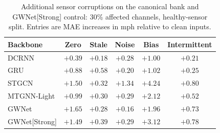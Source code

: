 \begin{table}[h]
\centering\small
\caption{Additional sensor corruptions on the canonical bank and GWNet[Strong] control: 30\% affected channels, healthy-sensor split. Entries are MAE increases in mph relative to clean inputs.}
\label{tab:corruption_summary}
\begin{tabular}{lccccc}
\toprule
\textbf{Backbone} & \textbf{Zero} & \textbf{Stale} & \textbf{Noise} & \textbf{Bias} & \textbf{Intermittent} \\
\midrule
DCRNN & $+0.39$ & $+0.18$ & $+0.28$ & $+1.00$ & $+0.21$ \\
GRU & $+0.88$ & $+0.58$ & $+0.20$ & $+1.02$ & $+0.25$ \\
STGCN & $+1.50$ & $+0.32$ & $+1.34$ & $+4.24$ & $+0.80$ \\
MTGNN-Light & $+0.99$ & $+0.30$ & $+0.29$ & $+2.12$ & $+0.52$ \\
GWNet & $+1.65$ & $+0.28$ & $+0.16$ & $+1.96$ & $+0.73$ \\
GWNet[Strong] & $+1.49$ & $+0.39$ & $+0.29$ & $+3.12$ & $+0.78$ \\
\bottomrule
\end{tabular}
\end{table}
